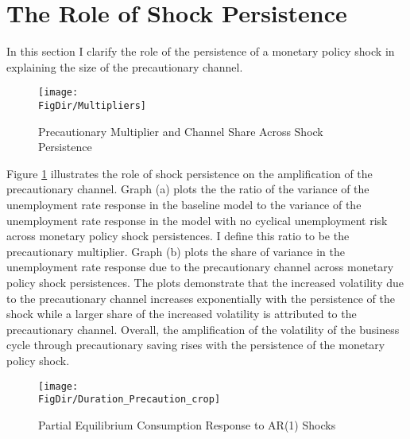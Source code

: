 \documentclass[titlepage]{\econtex}\providecommand{\texname}{Dissertation-Proposal}
\providecommand{\FigDir}{Figures}
\newcommand{\plotheight}{0.27}
\begin{document}
\hypertarget{The Role of Shock Persistence}{}
\section{The Role of Shock Persistence}

In this section I clarify the role of the persistence of a monetary policy shock in explaining the size of the precautionary channel. \\


\begin{figure}
    \centering
     \caption{ Precautionary Multiplier and Channel Share Across Shock Persistence }
    \texttt{[image: \\FigDir/Multipliers]}
     \label{fig:Multipliers}
\end{figure}

Figure \ref{fig:Multipliers} illustrates the role of shock persistence on the amplification of the precautionary channel. Graph (a) plots the the ratio of the variance of the unemployment rate response in the baseline model to the variance of the unemployment rate response in the model with no cyclical unemployment risk across monetary policy shock persistences. I define this ratio to be the precautionary multiplier. Graph (b) plots the share of variance in the unemployment rate response due to the precautionary channel across monetary policy shock persistences. The plots demonstrate that the increased volatility due to the precautionary channel increases exponentially with the persistence of the shock while a larger share of the increased volatility is attributed to the precautionary channel. Overall, the amplification of the volatility of the business cycle through precautionary saving rises with the persistence of the monetary policy shock.\\





\begin{figure}[H]
    \centering
    \caption{Partial Equilibrium Consumption Response to AR(1) Shocks }
    \texttt{[image: \\FigDir/Duration\_Precaution\_crop]}
    
     \label{fig:C_Responses}
\end{figure}
\end{document}
